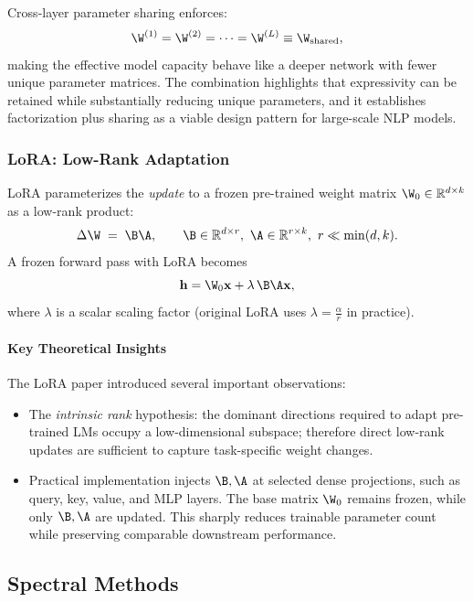 Cross-layer parameter sharing enforces:
\begin{equation}
  \W^{(1)}=\W^{(2)}=\dots=\W^{(L)} \equiv \W_{\text{shared}},
\end{equation}
making the effective model capacity behave like a deeper network with fewer unique parameter matrices. The combination highlights that expressivity can be retained while substantially reducing unique parameters, and it establishes factorization plus sharing as a viable design pattern for large-scale NLP models.

\subsubsection{LoRA: Low-Rank Adaptation \cite{hu2021lora}}
\label{subsubsec:lora}

LoRA parameterizes the \emph{update} to a frozen pre-trained weight matrix $\W_0\in\mathbb{R}^{d\times k}$ as a low-rank product:
\begin{equation}
  \Delta\W \;=\; \B\A, \qquad \B\in\mathbb{R}^{d\times r},\ \A\in\mathbb{R}^{r\times k},\ r\ll\min(d,k).
\end{equation}
A frozen forward pass with LoRA becomes
\begin{equation}
  \mathbf{h} = \W_0\mathbf{x} + \lambda\,\B\A\mathbf{x},
\end{equation}
where $\lambda$ is a scalar scaling factor (original LoRA uses $\lambda=\frac{\alpha}{r}$ in practice).

\paragraph{Key Theoretical Insights}
The LoRA paper introduced several important observations:
\begin{itemize}
  \item The \emph{intrinsic rank} hypothesis: the dominant directions required to adapt pre-trained LMs occupy a low-dimensional subspace; therefore direct low-rank updates are sufficient to capture task-specific weight changes.
  \item Practical implementation injects $\B,\A$ at selected dense projections, such as query, key, value, and MLP layers. The base matrix $\W_0$ remains frozen, while only $\B,\A$ are updated. This sharply reduces trainable parameter count while preserving comparable downstream performance.
\end{itemize}

\subsection{Spectral Methods}
\label{subsec:spectral}

